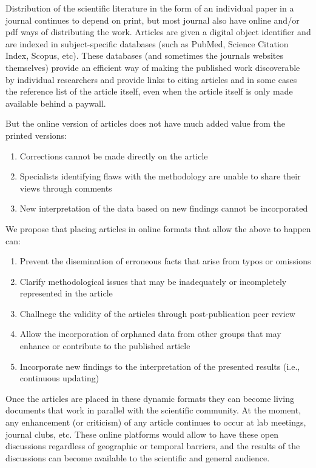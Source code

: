 \documentclass[final,authoryear,3p]{elsarticle-open-drafting}
\begin{document}
Distribution of the scientific literature in the form of an individual paper in a journal continues to depend on print, but most journal also have online and/or pdf ways of distributing the work. Articles are given a digital object identifier and are indexed in subject-specific databases (such as PubMed, Science Citation Index, Scopus, etc). These databases (and sometimes the journals websites themselves) provide an efficient way of making the published work discoverable by individual researchers and provide links to citing articles and in some cases the reference list of the article itself, even when the article itself is only made available behind a paywall. 

But the online version of articles does not have much added value from the printed versions:
\begin{enumerate}
\item Corrections cannot be made directly on the article 
\item Specialists identifying flaws with the methodology are unable to share their views through comments
\item New interpretation of the data based on new findings cannot be incorporated
\end{enumerate}

We propose that placing articles in online formats that allow the above to happen can:
\begin{enumerate}
\item Prevent the disemination of erroneous facts that arise from typos or omissions
\item Clarify methodological issues that may be inadequately or incompletely represented in the article
\item Challnege the validity of the articles through post-publication peer review
\item Allow the incorporation of orphaned data from other groups that may enhance or contribute to the published article
\item Incorporate new findings to the interpretation of the presented results (i.e., continuous updating)
\end{enumerate}

Once the articles are placed in these dynamic formats they can become living documents that work in parallel with the scientific community. At the moment, any enhancement (or criticism) of any article continues to occur at lab meetings, journal clubs, etc. These online platforms would allow to have these open discussions regardless of geographic or temporal barriers, and the results of the discussions can become available to the scientific and general audience. 
\end{document}
